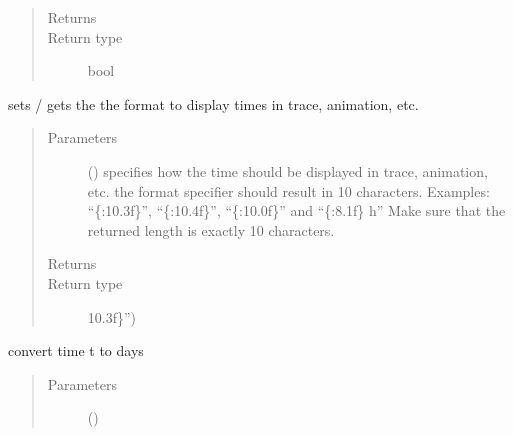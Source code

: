 \documentclass[letterpaper,10pt,english]{sphinxmanual}
\begin{document}
\begin{fulllineitems}
\begin{fulllineitems}
\begin{quote}
\begin{description}
\item[{Returns}] \leavevmode
{}

\item[{Return type}] \leavevmode
bool

\end{description}\end{quote}

\end{fulllineitems}


\begin{fulllineitems}
\label{\detokenize{Reference:salabim.Environment.time_to_str_format}}
sets / gets the the format to display times in trace, animation, etc.
\begin{quote}\begin{description}
\item[{Parameters}] \leavevmode
{} () \textendash{} specifies how the time should be displayed in trace, animation, etc. 
the format specifier should result in 10 characters. Examples: 
“\{:10.3f\}”, “\{:10.4f\}”, “\{:10.0f\}” and “\{:8.1f\} h” 
Make sure that the returned length is exactly 10 characters.

\item[{Returns}] \leavevmode
{}

\item[{Return type}] \leavevmode
10.3f\}”)

\end{description}\end{quote}

\end{fulllineitems}


\begin{fulllineitems}
\label{\detokenize{Reference:salabim.Environment.to_days}}
convert time t to days
\begin{quote}\begin{description}
\item[{Parameters}] \leavevmode
{} () \textendash{} 


\end{description}
\end{quote}
\end{fulllineitems}
\end{fulllineitems}
\end{document}
